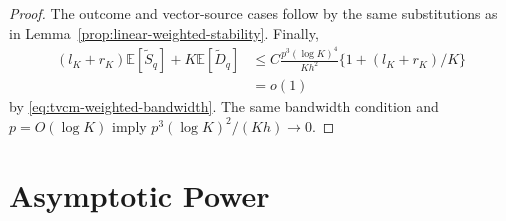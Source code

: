 \documentclass[12pt]{article}
\def\E{\mathbb{E}}
\numberwithin{equation}{section}
\begin{document}
\begin{proof}


The outcome and vector-source cases follow by the same
substitutions as in
Lemma~\ref{prop:linear-weighted-stability}.
Finally,
\begin{align*}
(l_K+r_K)\E[\tilde S_q]+K\E[\tilde D_q]
&\leq
C\frac{p^3(\log K)^4}{Kh^2}
\big\{1+(l_K+r_K)/K\big\}\\
&=o(1)
\end{align*}
by \eqref{eq:tvcm-weighted-bandwidth}.
The same bandwidth condition and $p=O(\log K)$ imply
$p^3(\log K)^2/(Kh)\to0$.
\end{proof}

\section{Asymptotic Power}
\label{app:power-results}
\end{document}
